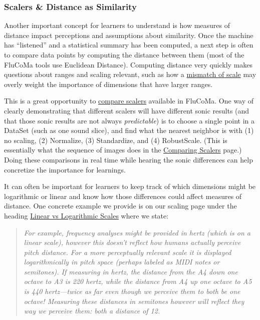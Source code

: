 \documentclass{article}
\begin{document}
\subsubsection{Scalers \& Distance as Similarity}

Another important concept for learners to understand is how measures of
distance impact perceptions and assumptions about similarity. Once the
machine has ``listened'' and a statistical summary has been computed, a
next step is often to compare data points by computing the distance
between them (most of the FluCoMa tools use Euclidean Distance).
Computing distance very quickly makes questions about ranges and scaling
relevant, such as how a
\href{https://youtu.be/qom6x1u4_6A?t=1122}{mismatch of scale} may
overly weight the importance of dimensions that have larger ranges.

This is a great opportunity to
\href{https://learn.flucoma.org/learn/comparing-scalers/}{compare
scalers} available in FluCoMa. One way of clearly demonstrating that
different scalers will have different sonic results (and that those
sonic results are not always \emph{predictable}) is to choose a single
point in a DataSet (such as one sound slice), and find what the nearest
neighbor is with (1) no scaling, (2) Normalize, (3) Standardize, and
(4) RobustScale. (This is essentially what the sequence of images does in
the \href{https://learn.flucoma.org/learn/comparing-scalers/}{Comparing
Scalers} page.) Doing these comparisons in real time while hearing the sonic differences
can help concretize the importance for learnings.

It can often be important for learners to keep track of which dimensions
might be logarithmic or linear and know how those differences could
affect measures of distance. One concrete example we provide is on our
scaling page under the heading
\href{https://learn.flucoma.org/learn/why-scale/\#linear-vs-logarithmic-scales}{Linear
vs Logarithmic Scales} where we state:

\begin{quote}
\emph{For example, frequency analyses might be provided in hertz (which
is on a linear scale), however this doesn't reflect how humans actually
perceive pitch distance. For a more perceptually relevant scale it is
displayed logarithmically in pitch space (perhaps labeled as MIDI notes
or semitones). If measuring in hertz, the distance from the A4 down one
octave to A3 is 220 hertz, while the distance from A4 up one octave to
A5 is 440 hertz---twice as far even though we perceive them to both be
one octave! Measuring these distances in semitones however will reflect
they way we perceive them: both a distance of 12.}
\end{quote}
\end{document}
